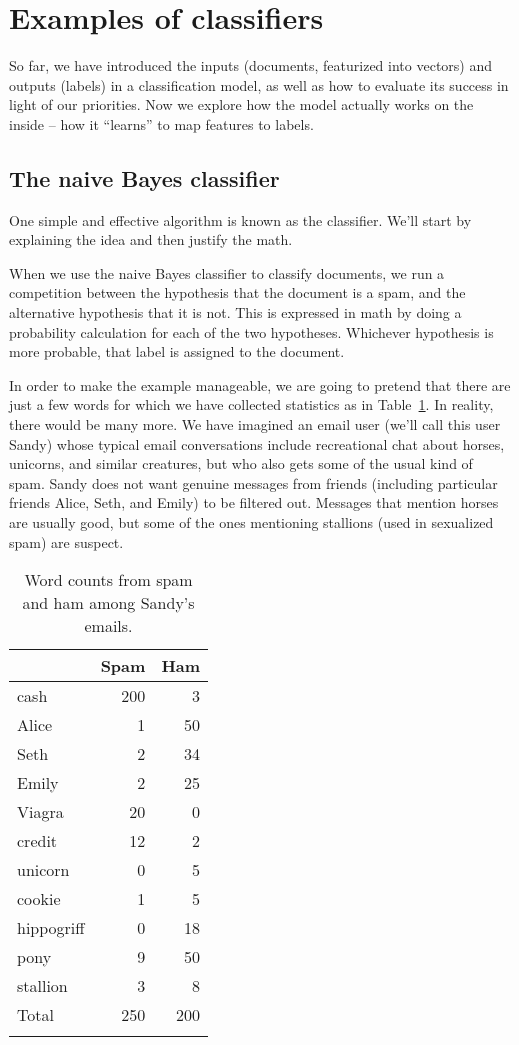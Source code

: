 \section{Examples of classifiers}

So far, we have introduced the inputs (documents, featurized into vectors) and outputs (labels) in a  classification model, as well as how to evaluate its success in light of our priorities.  Now we explore how the model actually works on the inside -- how it ``learns'' to map features to labels.


\subsection{The naive Bayes classifier} \label{sec:nb}

One simple and effective
algorithm is known as the  classifier. We'll
start by explaining the idea and then justify the math.

When we use the naive Bayes classifier to classify documents, we run a
competition between the hypothesis that the document is a spam, and the alternative hypothesis that it is not.  This is
expressed in math by doing a probability calculation for each of the
two hypotheses.  Whichever hypothesis is more probable, that label is assigned to the document.

In order to make the example manageable, we are
going to pretend that there are just a few words for which we have
collected statistics as in Table~\ref{spam:data}. In reality, there would be many more.  We have
imagined an email user (we'll call this user Sandy) whose typical email
conversations include recreational chat about horses, unicorns, and
similar creatures, but who also gets some of the usual kind of
spam. Sandy does not want genuine messages from friends (including
particular friends Alice, Seth, and Emily) to be filtered out. Messages
that mention horses are usually good, but some of the ones
mentioning stallions (used in sexualized spam) are suspect.

\begin{table}
\begin{tabular}{l rr}
\lsptoprule
  & {Spam} & {Ham} \\ \midrule
cash & 200 & 3 \\
Alice & 1 & 50 \\
Seth & 2 & 34\\
Emily & 2 & 25 \\
Viagra & 20 & 0 \\
credit & 12 & 2 \\
unicorn & 0 & 5 \\
cookie  & 1 & 5 \\
hippogriff & 0 & 18 \\
pony & 9 & 50 \\ 
stallion & 3 & 8 \\ \addlinespace
{Total} & 250 & 200 \\ 
\lspbottomrule
\end{tabular}
\caption{Word counts from spam and ham among Sandy's emails.}
\label{spam:data}
\end{table}


